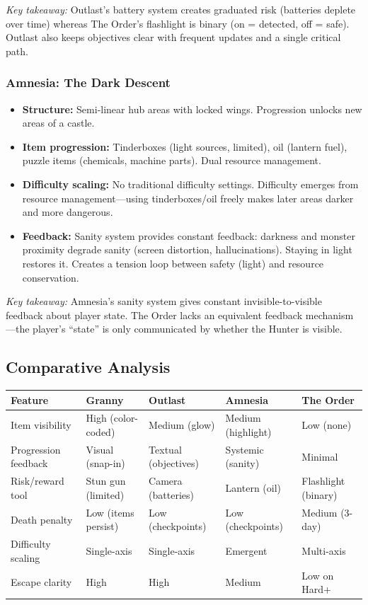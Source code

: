 \documentclass[11pt]{article}
\begin{document}
\textit{Key takeaway:} Outlast's battery system creates graduated risk (batteries deplete over time) whereas The Order's flashlight is binary (on = detected, off = safe). Outlast also keeps objectives clear with frequent updates and a single critical path.

\subsubsection{Amnesia: The Dark Descent}
\begin{itemize}[nosep]
\item \textbf{Structure:} Semi-linear hub areas with locked wings. Progression unlocks new areas of a castle.
\item \textbf{Item progression:} Tinderboxes (light sources, limited), oil (lantern fuel), puzzle items (chemicals, machine parts). Dual resource management.
\item \textbf{Difficulty scaling:} No traditional difficulty settings. Difficulty emerges from resource management---using tinderboxes/oil freely makes later areas darker and more dangerous.
\item \textbf{Feedback:} Sanity system provides constant feedback: darkness and monster proximity degrade sanity (screen distortion, hallucinations). Staying in light restores it. Creates a tension loop between safety (light) and resource conservation.
\end{itemize}

\textit{Key takeaway:} Amnesia's sanity system gives constant invisible-to-visible feedback about player state. The Order lacks an equivalent feedback mechanism---the player's ``state'' is only communicated by whether the Hunter is visible.

\subsection{Comparative Analysis}

\begin{table}[h]
\centering
\small
\begin{tabular}{@{}lllll@{}}
\toprule
\textbf{Feature} & \textbf{Granny} & \textbf{Outlast} & \textbf{Amnesia} & \textbf{The Order} \\
\midrule
Item visibility & High (color-coded) & Medium (glow) & Medium (highlight) & Low (none) \\
Progression feedback & Visual (snap-in) & Textual (objectives) & Systemic (sanity) & Minimal \\
Risk/reward tool & Stun gun (limited) & Camera (batteries) & Lantern (oil) & Flashlight (binary) \\
Death penalty & Low (items persist) & Low (checkpoints) & Low (checkpoints) & Medium (3-day) \\
Difficulty scaling & Single-axis & Single-axis & Emergent & Multi-axis \\
Escape clarity & High & High & Medium & Low on Hard+ \\
\bottomrule
\end{tabular}
\end{table}
\end{document}
